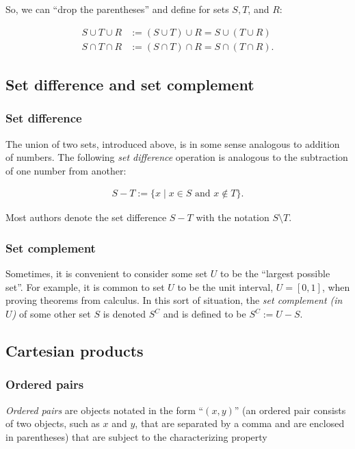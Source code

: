 So, we can ``drop the parentheses'' and define for sets $S, T$, and $R$:

\begin{align*}
    S \cup T \cup R &:= (S \cup T) \cup R = S \cup (T \cup R) \\
    S \cap T \cap R &:= (S \cap T) \cap R = S \cap (T \cap R).
\end{align*}

\subsection*{Set difference and set complement}

\subsubsection*{Set difference}

The union of two sets, introduced above, is in some sense analogous to addition of numbers. The following \textit{set difference} operation is analogous to the subtraction of one number from another:

\begin{align*}
    S - T := \{ x \mid x \in S \text{ and } x \notin T \}.
\end{align*}

Most authors denote the set difference $S - T$ with the notation $S \setminus T$.

\subsubsection*{Set complement}

Sometimes, it is convenient to consider some set $U$ to be the ``largest possible set''. For example, it is common to set $U$ to be the unit interval, $U = [0, 1]$, when proving theorems from calculus. In this sort of situation, the \textit{set complement (in $U$)} of some other set $S$ is denoted $S^C$ and is defined to be $S^C := U - S$.

\subsection*{Cartesian products}

\subsubsection*{Ordered pairs}

\textit{Ordered pairs} are objects notated in the form ``$(x, y)$'' (an ordered pair consists of two objects, such as $x$ and $y$, that are separated by a comma and are enclosed in parentheses) that are subject to the characterizing property

